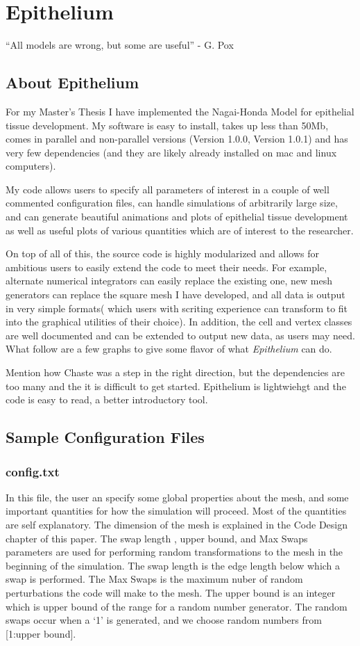 \chapter{Epithelium}
\begin{center}
``All models are wrong, but some are useful'' - G. Pox
\end{center}
\section{About Epithelium}
For my Master's Thesis I have implemented the Nagai-Honda Model for epithelial tissue development. My software is easy to install, takes up less than 50Mb, comes in parallel and non-parallel versions (Version 1.0.0, Version 1.0.1) and has very few dependencies (and they are likely already installed on mac and linux computers). 

My code allows users to specify all parameters of interest in a couple of well commented configuration files, can handle simulations of arbitrarily large size, and can generate beautiful animations and plots of epithelial tissue development as well as useful plots of various quantities which are of interest to the researcher. 

On top of all of this, the source code is highly modularized and allows for ambitious users to easily extend the code to meet their needs. For example, alternate numerical integrators can easily replace the existing one, new mesh generators can replace the square mesh I have developed, and all data is output in very simple formats( which users with scriting experience can transform to fit into the graphical utilities of their choice). In addition, the cell and vertex classes are well documented and can be extended to output new data, as users may need. What follow are a few graphs to give some flavor of what \emph{Epithelium} can do.

Mention how Chaste was a step in the right direction, but the dependencies are too many and the it is difficult to get started. Epithelium is lightwiehgt and the code is easy to read, a better introductory tool. 
\section{Sample Configuration Files}
\subsection{config.txt}
In this file, the user an specify some global properties about the mesh, and some important quantities for how the simulation will proceed. Most of the quantities are self explanatory. The dimension of the mesh is explained in the Code Design chapter of this paper. The swap length , upper bound, and Max Swaps parameters are used for performing random transformations to the mesh in the beginning of the simulation. The swap length is the edge length below which a swap is performed. The Max Swaps is the maximum nuber of random perturbations the code will make to the mesh. The upper bound is an integer which is upper bound of the range for a random number generator. The random swaps occur when a `1' is generated, and we choose random numbers from [1:upper bound].

